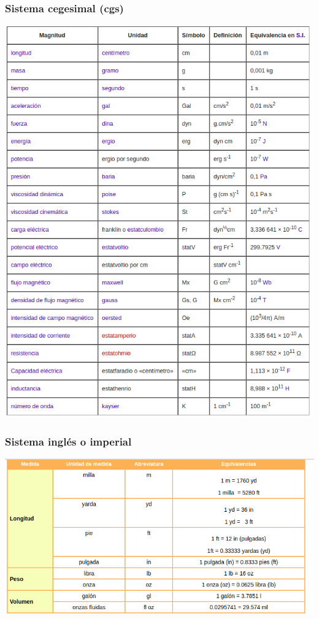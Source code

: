 \documentclass[11pt]{article}
\theoremstyle{definition}
\begin{document}
\subsubsection{Sistema cegesimal (cgs)}

\includegraphics[scale=0.7]{img/cgs.png}

\subsubsection{Sistema inglés o imperial}

\includegraphics[scale=0.6]{img/singles.png}

\end{document}

